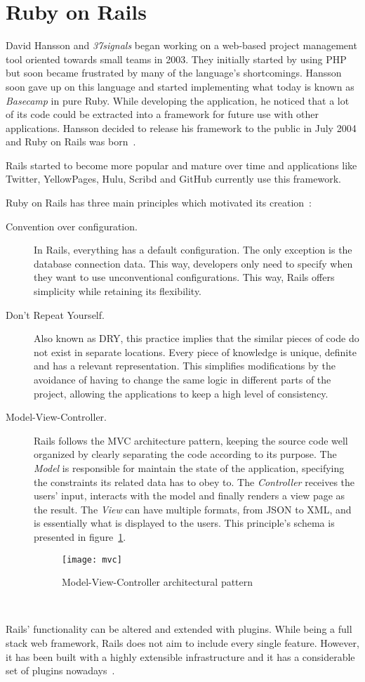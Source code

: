 \section{Ruby on Rails} %
\label{tech:sec:ruby_on_rails}
David Hansson and \textit{37signals} began working on a web-based project management tool oriented towards small teams in 2003. They initially started by using PHP but soon became frustrated by many of the language's shortcomings. Hansson soon gave up on this language and started implementing what today is known as \textit{Basecamp} in pure Ruby. While developing the application, he noticed that a lot of its code could be extracted into a framework for future use with other applications. Hansson decided to release his framework to the public in July 2004 and Ruby on Rails was born~\cite{railssolutions}.

Rails started to become more popular and mature over time and applications like Twitter, YellowPages, Hulu, Scribd and GitHub currently use this framework.

Ruby on Rails has three main principles which motivated its creation~\cite{agile_webdevelopment_with_rails, ruby_on_rails_principles}:
\begin{description}
\item[Convention over configuration.] In Rails, everything has a default configuration. The only exception is the database connection data. This way, developers only need to specify when they want to use unconventional configurations. This way, Rails offers simplicity while retaining its flexibility.
\item[Don't Repeat Yourself.] Also known as DRY, this practice implies that the similar pieces of code do not exist in separate locations. Every piece of knowledge is unique, definite and has a relevant representation. This simplifies modifications by the avoidance of having to change the same logic in different parts of the project, allowing the applications to keep a high level of consistency. 
\item[Model-View-Controller.] Rails follows the MVC architecture pattern, keeping the source code well organized by clearly separating the code according to its purpose. The \textit{Model} is responsible for maintain the state of the application, specifying the constraints its related data has to obey to. The \textit{Controller} receives the users' input, interacts with the model and finally renders a view page as the result. The \textit{View} can have multiple formats, from JSON to XML, and is essentially what is displayed to the users. This principle's schema is presented in figure~\ref{fig:mvc}.
\begin{figure}[h]
  \centering
    \texttt{[image: mvc]}
  \caption{Model-View-Controller architectural pattern}
  \label{fig:mvc}
\end{figure}\\
\end{description}
Rails' functionality can be altered and extended with plugins. While being a full stack web framework, Rails does not aim to include every single feature. However, it has been built with a highly extensible infrastructure and it has a considerable set of plugins nowadays~\cite{rails_magazine_1}.


